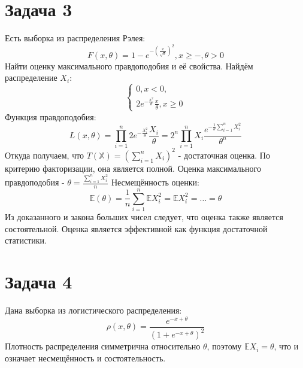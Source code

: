 \documentclass[11pt]{article}
\begin{document}
\section{Задача 3}
\label{sec:orgd135694}
Есть выборка из распределения Рэлея:
$$F(x, \theta) = 1 - e^{-\left(\frac{x}{\sqrt\theta}\right)^2}, x \geq -, \theta > 0$$
Найти оценку максимального правдоподобия и её свойства.
Найдём распределение \(X_i\):
\begin{equation*}
\begin{cases}
0, x < 0, \\
2e^{-\frac{x^2}{\theta}}\frac{x}\theta, x \geq 0
\end{cases}
\end{equation*}
Функция правдоподобия:
$$L(x, \theta) = \prod_{i = 1}^n2e^{-\frac{X_i^2}{\theta}}\frac{X_i}{\theta}
= 2^n\prod_{i = 1}^n{X_i}\frac{e^{-\frac{1}\theta\sum_{i = 1}^n{X_i^2}}}{\theta^n}$$
Откуда получаем, что \(T(\mathbb{X}) = (\sum_{i = 1}^nX_i)^2\) - достаточная оценка. По критерию факторизации, она
является полной. Оценка максимального правдоподобия - \(\theta = \frac{\sum_{i = 1}^nX_i^2}n\)
Несмещённость оценки:
$$\mathbb{E}(\theta) = \frac{1}n\sum_{i = 1}^n\mathbb{E}X_i^2 = \mathbb{E}X_i^2 = \ldots = \theta$$
Из доказанного и закона больших чисел следует, что оценка также является состоятельной. Оценка является
эффективной как функция достаточной статистики.
\section{Задача 4}
\label{sec:orgd106b89}
Дана выборка из логистического распределения:
$$\rho(x, \theta) = \frac{e^{-x + \theta}}{(1 + e^{-x + \theta})^2}$$
Плотность распределения симметрична относительно \(\theta\), поэтому \(\mathbb{E}X_i = \theta\), что и означает
несмещённость и состоятельность.
\end{document}
